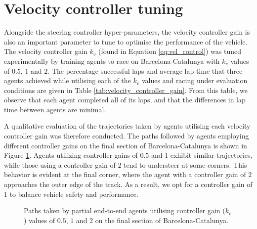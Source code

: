 \section{Velocity controller tuning}

Alongside the steering controller hyper-parameters, the velocity controller gain is also an important parameter to tune to optimise the performance of the vehicle.
The velocity controller gain $k_v$ (found in Equation \ref{eq:vel_control}) was tuned experimentally by training agents to race on Barcelona-Catalunya with $k_v$ values of $0.5$, $1$ and $2$.
The percentage successful laps and average lap time that three agents achieved while utilising each of the $k_v$ values and racing under evaluation conditions are given in Table \ref{tab:velocity_controller_gain}.
From this table, we observe that each agent completed all of its laps, and that the differences in lap time between agents are minimal.




A qualitative evaluation of the trajectories taken by agents utilising each velocity controller gain was therefore conducted.
The paths followed by agents employing different controller gains on the final section of Barcelona-Catalunya is shown in Figure \ref{fig:kv_paths}.
Agents utilizing controller gains of $0.5$ and $1$ exhibit similar trajectories, while those using a controller gain of $2$ tend to understeer at some corners. 
This behavior is evident at the final corner, where the agent with a controller gain of $2$ approaches the outer edge of the track. 
As a result, we opt for a controller gain of $1$ to balance vehicle safety and performance.

\begin{figure}[t]
    \centering
    
    \caption[Paths taken by partial end-to-end agents utilising controller gain ($k_v$) values of $0.5$, $1$ and $2$ on the final section of  Barcelona-Catalunya]{Paths taken by partial end-to-end agents utilising controller gain ($k_v$) values of $0.5$, $1$ and $2$ on the final section of  Barcelona-Catalunya.}
    \label{fig:kv_paths}
\end{figure}







